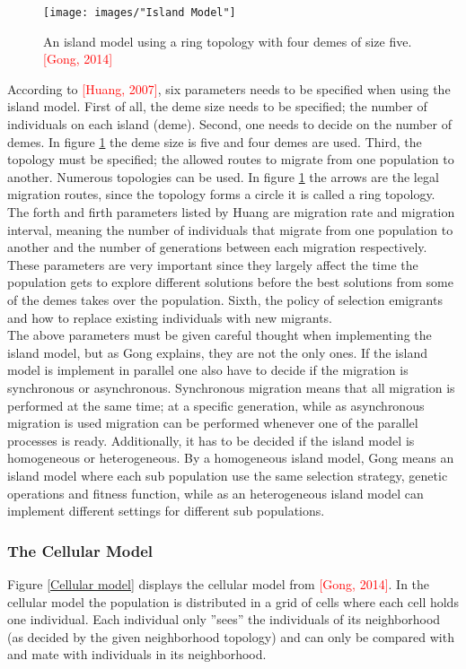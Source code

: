 \begin{figure}[h!]
\begin{center}
\texttt{[image: images/"Island Model"]}
\caption{An island model using a ring topology with four demes of size five. \textcolor{red}{[Gong, 2014]}}
\label{Island model}
\end{center}
\end{figure}


According to \textcolor{red}{[Huang, 2007]}, six parameters needs to be specified when using the island model. First of all, the deme size needs to be specified; the number of individuals on each island (deme). Second, one needs to decide on the number of demes. In figure \ref{Island model} the deme size is five and four demes are used. Third, the topology must be specified; the allowed routes to migrate from one population to another. Numerous topologies can be used. In figure \ref{Island model} the arrows are the legal migration routes, since the topology forms a circle it is called a ring topology. The forth and firth parameters listed by Huang are migration rate and migration interval, meaning the number of individuals that migrate from one population to another and the number of generations between each migration respectively. These parameters are very important since they largely affect the time the population gets to explore different solutions before the best solutions from some of the demes takes over the population. Sixth, the policy of selection emigrants and how to replace existing individuals with new migrants. \\


\noindent The above parameters must be given careful thought when implementing the island model, but as Gong explains, they are not the only ones. If the island model is implement in parallel one also have to decide if the migration is synchronous or asynchronous. Synchronous migration means that all migration is performed at the same time; at a specific generation, while as asynchronous migration is used migration can be performed whenever one of the parallel processes is ready. Additionally, it has to be decided if the island model is homogeneous or heterogeneous. By a homogeneous island model, Gong means an island model where each sub population use the same selection strategy, genetic operations and fitness function, while as an heterogeneous island model can implement different settings for different sub populations.


\subsubsection{The Cellular Model}
Figure \ref{Cellular model} displays the cellular model from \textcolor{red}{[Gong, 2014]}. In the cellular model the population is distributed in a grid of cells where each cell holds one individual. Each individual only ''sees'' the individuals of its neighborhood (as decided by the given neighborhood topology) and can only be compared with and mate with individuals in its neighborhood. \\


